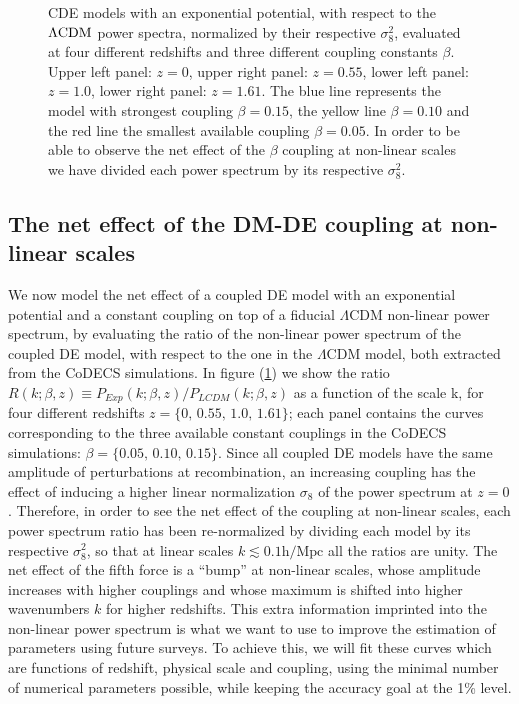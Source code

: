 \begin{figure}
{CDE models with an exponential potential, with respect to the 
$\protect\Lambda\mathrm{CDM}$ power spectra, normalized by their respective $\sigma_{8}^{2}$,
evaluated at four different redshifts and three different coupling
constants $\beta$. Upper left panel: $z=0$, upper right panel: $z=0.55$,
lower left panel: $z=1.0$, lower right panel: $z=1.61$. The blue
line represents the model with strongest coupling \textbf{$\beta=0.15$},
the yellow line $\beta=0.10$ and the red line the smallest available
coupling $\beta=0.05$. In order to be able to observe the net effect
of the $\beta$ coupling at non-linear scales we have divided each
power spectrum by its respective $\sigma_{8}^{2}$.}
\label{fig:Ratio-of-CoDECS} 
\end{figure}

\subsection{The net effect of the DM-DE coupling at non-linear scales}

We now model the net effect of a coupled DE model with an exponential
potential and a constant coupling on top of a fiducial $\Lambda$CDM
non-linear power spectrum, by evaluating the ratio of the non-linear
power spectrum of the coupled DE model, with respect to the one in
the $\Lambda$CDM model, both extracted from the CoDECS simulations.
In figure (\ref{fig:Ratio-of-CoDECS}) we show the ratio $R(k;\beta,z)\equiv P_{Exp}(k;\beta,z)/P_{LCDM}(k;\beta,z)$
as a function of the scale k, for four different redshifts $z=\{0,\,0.55,\,1.0,\,1.61\}$;
each panel contains the curves corresponding to the three available
constant couplings in the CoDECS simulations: \textbf{$\beta=\{0.05,\,0.10,\,0.15\}$}.
Since all coupled DE models have the same amplitude of perturbations
at recombination, an increasing coupling has the effect of inducing
a higher linear normalization $\sigma_{8}$ of the power spectrum
at $z=0$ \citep{baldi_codecs_2012}. Therefore, in order to see the
net effect of the coupling at non-linear scales, each power spectrum
ratio has been re-normalized by dividing each model by its respective
$\sigma_{8}^{2}$, so that at linear scales $k\lesssim0.1\mbox{h}/\mbox{Mpc}$
all the ratios are unity. The net effect of the fifth force is a ``bump''
at non-linear scales, whose amplitude increases with higher couplings
and whose maximum is shifted into higher wavenumbers $k$ for higher
redshifts. This extra information imprinted into the non-linear power
spectrum is what we want to use to improve the estimation of parameters
using future surveys. To achieve this, we will fit these curves which
are functions of redshift, physical scale and coupling, using the
minimal number of numerical parameters possible, while keeping the
accuracy goal at the 1\% level.


